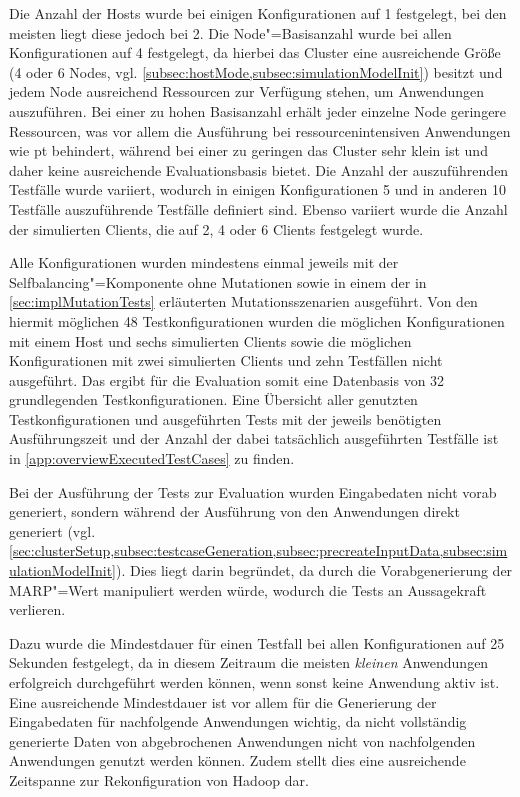 Die Anzahl der Hosts wurde bei einigen Konfigurationen auf 1 festgelegt, bei den meisten liegt diese jedoch bei 2.
Die Node"=Basisanzahl wurde bei allen Konfigurationen auf 4 festgelegt, da hierbei das Cluster eine ausreichende Größe (4 oder 6 Nodes, vgl. \cref{subsec:hostMode,subsec:simulationModelInit}) besitzt und jedem Node ausreichend Ressourcen zur Verfügung stehen, um Anwendungen auszuführen.
Bei einer zu hohen Basisanzahl erhält jeder einzelne Node geringere Ressourcen, was vor allem die Ausführung bei ressourcenintensiven Anwendungen wie \zB \acrlong{pt} behindert, während bei einer zu geringen das Cluster sehr klein ist und daher keine ausreichende Evaluationsbasis bietet.
Die Anzahl der auszuführenden Testfälle wurde variiert, wodurch in einigen Konfigurationen 5 und in anderen 10 Testfälle auszuführende Testfälle definiert sind.
Ebenso variiert wurde die Anzahl der simulierten Clients, die auf 2, 4 oder 6 Clients festgelegt wurde.

Alle Konfigurationen wurden mindestens einmal jeweils mit der Selfbalancing"=Komponente ohne Mutationen sowie in einem der in \cref{sec:implMutationTests} erläuterten Mutationsszenarien ausgeführt.
Von den hiermit möglichen 48 Testkonfigurationen wurden die möglichen Konfigurationen mit einem Host und sechs simulierten Clients sowie die möglichen Konfigurationen mit zwei simulierten Clients und zehn Testfällen nicht ausgeführt.
Das ergibt für die Evaluation somit eine Datenbasis von 32 grundlegenden Testkonfigurationen.
Eine Übersicht aller genutzten Testkonfigurationen und ausgeführten Tests mit der jeweils benötigten Ausführungszeit und der Anzahl der dabei tatsächlich ausgeführten Testfälle ist in \cref{app:overviewExecutedTestCases} zu finden.

Bei der Ausführung der Tests zur Evaluation wurden Eingabedaten nicht vorab generiert, sondern während der Ausführung von den Anwendungen direkt generiert (vgl. \cref{sec:clusterSetup,subsec:testcaseGeneration,subsec:precreateInputData,subsec:simulationModelInit}).
Dies liegt darin begründet, da durch die Vorabgenerierung der \gls{MARP}"=Wert manipuliert werden würde, wodurch die Tests an Aussagekraft verlieren.

Dazu wurde die Mindestdauer für einen Testfall bei allen Konfigurationen auf 25 Sekunden festgelegt, da in diesem Zeitraum die meisten \emph{kleinen} Anwendungen erfolgreich durchgeführt werden können, wenn sonst keine Anwendung aktiv ist.
Eine ausreichende Mindestdauer ist vor allem für die Generierung der Eingabedaten für nachfolgende Anwendungen wichtig, da nicht vollständig generierte Daten von abgebrochenen Anwendungen nicht von nachfolgenden Anwendungen genutzt werden können.
Zudem stellt dies eine ausreichende Zeitspanne zur Rekonfiguration von Hadoop dar.
